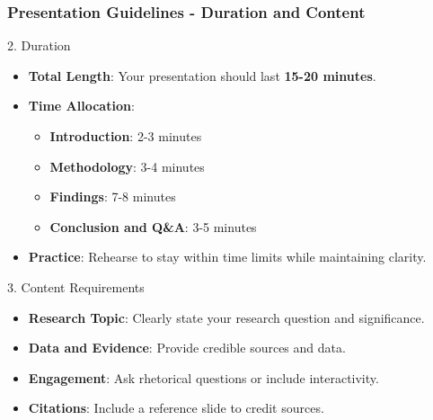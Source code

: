 \documentclass[aspectratio=169]{beamer}
\begin{document}
\begin{frame}[fragile]
    \frametitle{Presentation Guidelines - Duration and Content}
    \begin{block}{2. Duration}
        \begin{itemize}
            \item \textbf{Total Length}: Your presentation should last \textbf{15-20 minutes}.
            \item \textbf{Time Allocation}:
                \begin{itemize}
                    \item \textbf{Introduction}: 2-3 minutes
                    \item \textbf{Methodology}: 3-4 minutes
                    \item \textbf{Findings}: 7-8 minutes
                    \item \textbf{Conclusion and Q\&A}: 3-5 minutes
                \end{itemize}
            \item \textbf{Practice}: Rehearse to stay within time limits while maintaining clarity.
        \end{itemize}
    \end{block}

    \begin{block}{3. Content Requirements}
        \begin{itemize}
            \item \textbf{Research Topic}: Clearly state your research question and significance. 
            \item \textbf{Data and Evidence}: Provide credible sources and data.
            \item \textbf{Engagement}: Ask rhetorical questions or include interactivity.
            \item \textbf{Citations}: Include a reference slide to credit sources.
        \end{itemize}
    \end{block}
\end{frame}
\end{document}
